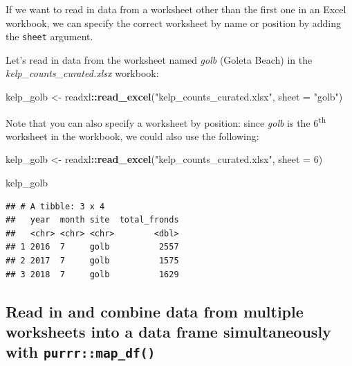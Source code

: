 \documentclass[]{book}
\newenvironment{Shaded}{\begin{snugshade}}{\end{snugshade}}
\newcommand{\DataTypeTok}[1]{\textcolor[rgb]{0.13,0.29,0.53}{#1}}
\newcommand{\DecValTok}[1]{\textcolor[rgb]{0.00,0.00,0.81}{#1}}
\newcommand{\KeywordTok}[1]{\textcolor[rgb]{0.13,0.29,0.53}{\textbf{#1}}}
\newcommand{\NormalTok}[1]{#1}
\newcommand{\OperatorTok}[1]{\textcolor[rgb]{0.81,0.36,0.00}{\textbf{#1}}}
\newcommand{\StringTok}[1]{\textcolor[rgb]{0.31,0.60,0.02}{#1}}
\begin{document}
If we want to read in data from a worksheet other than the first one in an Excel workbook, we can specify the correct worksheet by name or position by adding the \texttt{sheet} argument.

Let's read in data from the worksheet named \emph{golb} (Goleta Beach) in the \emph{kelp\_counts\_curated.xlsx} workbook:

\begin{Shaded}
\begin{Highlighting}[]
\NormalTok{kelp_golb <-}\StringTok{ }\NormalTok{readxl}\OperatorTok{::}\KeywordTok{read_excel}\NormalTok{(}\StringTok{"kelp_counts_curated.xlsx"}\NormalTok{, }\DataTypeTok{sheet =} \StringTok{"golb"}\NormalTok{)}
\end{Highlighting}
\end{Shaded}

Note that you can also specify a worksheet by position: since \emph{golb} is the 6\textsuperscript{th} worksheet in the workbook, we could also use the following:

\begin{Shaded}
\begin{Highlighting}[]
\NormalTok{kelp_golb <-}\StringTok{ }\NormalTok{readxl}\OperatorTok{::}\KeywordTok{read_excel}\NormalTok{(}\StringTok{"kelp_counts_curated.xlsx"}\NormalTok{, }\DataTypeTok{sheet =} \DecValTok{6}\NormalTok{)}
\end{Highlighting}
\end{Shaded}

\begin{Shaded}
\begin{Highlighting}[]
\NormalTok{kelp_golb}
\end{Highlighting}
\end{Shaded}

\begin{verbatim}
## # A tibble: 3 x 4
##   year  month site  total_fronds
##   <chr> <chr> <chr>        <dbl>
## 1 2016  7     golb          2557
## 2 2017  7     golb          1575
## 3 2018  7     golb          1629
\end{verbatim}

\hypertarget{read-in-and-combine-data-from-multiple-worksheets-into-a-data-frame-simultaneously-with-purrrmap_df}{%
\subsection{\texorpdfstring{Read in and combine data from multiple worksheets into a data frame simultaneously with \texttt{purrr::map\_df()}}{Read in and combine data from multiple worksheets into a data frame simultaneously with purrr::map\_df()}}\label{read-in-and-combine-data-from-multiple-worksheets-into-a-data-frame-simultaneously-with-purrrmap_df}}
\end{document}
